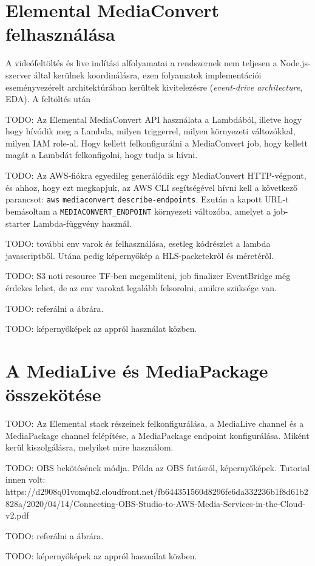 \section{Elemental MediaConvert felhasználása}

A videófeltöltés és live indítási alfolyamatai a rendszernek nem teljesen a Node.js-szerver által kerülnek koordinálásra, ezen folyamatok implementációi eseményvezérelt architektúrában kerültek kivitelezésre (\emph{event-drive architecture}, EDA). A feltöltés után 

TODO: Az Elemental MediaConvert API használata a Lambdából, illetve hogy hogy hívódik meg a Lambda, milyen triggerrel, milyen környezeti változókkal, milyen IAM role-al. Hogy kellett felkonfigurálni a MediaConvert job, hogy kellett magát a Lambdát felkonfigolni, hogy tudja is hívni.

TODO: Az AWS-fiókra egyedileg generálódik egy MediaConvert HTTP-végpont, és ahhoz, hogy ezt megkapjuk, az AWS CLI segítségével hívni kell a következő parancsot: \verb|aws| \verb|mediaconvert| \verb|describe-endpoints|. Ezután a kapott URL-t bemásoltam a \verb|MEDIACONVERT_ENDPOINT| környezeti változóba, amelyet a job-starter Lambda-függvény használ.

TODO: további env varok és felhasználása, esetleg kódrészlet a lambda javascriptből. Utána pedig képernyőkép a HLS-packetekről és méretéről.

TODO: S3 noti resource TF-ben megemlíteni, job finalizer EventBridge még érdekes lehet, de az env varokat legalább felsorolni, amikre szüksége van.

TODO: referálni a  ábrára.

TODO: képernyőképek az appról használat közben.

\section{A MediaLive és MediaPackage összekötése}

TODO: Az Elemental stack részeinek felkonfigurálása, a MediaLive channel és a MediaPackage channel felépítése, a MediaPackage endpoint konfigurálása. Miként kerül kiszolgálásra, melyiket mire használom. 

TODO: OBS bekötésének módja. Példa az OBS futásról, képernyőképek. Tutorial innen volt: https://d2908q01vomqb2.cloudfront.net/fb644351560d8296fe6da332236b1f8d61b2828a/2020/04/14/Connecting-OBS-Studio-to-AWS-Media-Services-in-the-Cloud-v2.pdf

TODO: referálni a  ábrára.

TODO: képernyőképek az appról használat közben.
